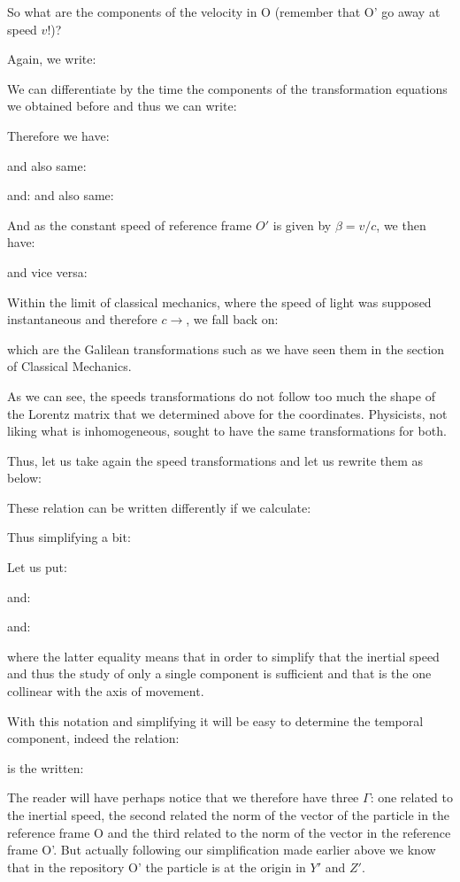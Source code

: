 	So what are the components of the velocity in O (remember that O' go away at speed $v$!)?
	
	Again, we write:
	
	We can differentiate by the time the components of the transformation equations we obtained before and thus we can write:
	
	Therefore we have:
	
	and also same:
	
	and:
	and also same:
	
	And as the constant speed of reference frame $O'$ is given by $\beta=v/c$, we then have:
	
	and vice versa:
	
	Within the limit of classical mechanics, where the speed of light was supposed instantaneous and therefore $c\rightarrow$, we fall back on:
	
	which are the Galilean transformations such as we have seen them in the section of Classical Mechanics.

	As we can see, the speeds transformations do not follow too much the shape of the Lorentz matrix that we determined above for the coordinates. Physicists, not liking what is inhomogeneous, sought to have the same transformations for both.

	Thus, let us take again the speed transformations and let us rewrite  them as below:
	
	These relation can be written differently if we calculate:
	
	Thus simplifying a bit:
	
	Let us put:
	
	and:
	
	and:
	
	where the latter equality means that in order to simplify that the inertial speed and thus the study of only a single component is sufficient and that is the one collinear with the axis of movement.

	With this notation and simplifying it will be easy to determine the temporal component, indeed the relation:
	
	is the written:
	
	The reader will have perhaps notice that we therefore have three $\Gamma$: one related to the inertial speed, the second related the norm of the vector of the particle in the reference frame O and the third related to the norm of the vector in the reference frame O'. But actually following our simplification made earlier above we know that in the repository O' the particle is at the origin in $Y'$ and $Z'$.

